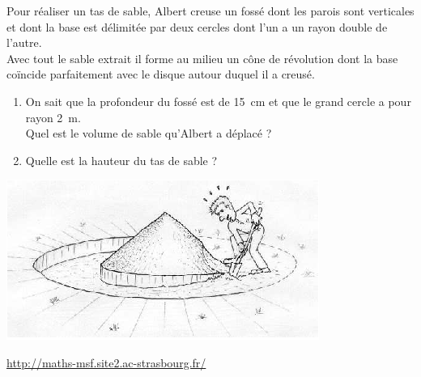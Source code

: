 
 Pour réaliser un tas de sable, Albert creuse un fossé dont les
  parois sont verticales et dont la base est délimitée par deux
  cercles dont l'un a un rayon double de l'autre.\\
  Avec tout le sable extrait il forme au milieu un cône de révolution
  dont la base coïncide parfaitement avec le disque autour duquel il a
  creusé.\\

    \begin{minipage}{0.48\linewidth} 
  \begin{enumerate}
    \item On sait que la profondeur du fossé est de 15~cm et que le
      grand cercle a pour rayon 2~m.
      \\Quel est le volume de sable qu'Albert a déplacé ?
    \item Quelle est la hauteur du tas de sable ?
  \end{enumerate}
\end{minipage} 
 \hfill
 \begin{minipage}{0.48\linewidth}
 
  \includegraphics[scale=0.8]{RepS-50.png} 
 
  \hfill{\footnotesize \url{http://maths-msf.site2.ac-strasbourg.fr/}}
  \end{minipage}